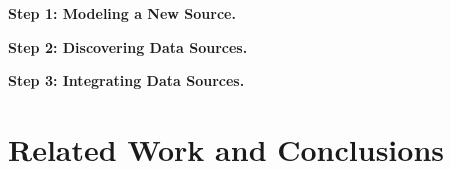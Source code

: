 \documentclass[runningheads,a4paper]{llncs}
\begin{document}
\textbf{Step 1: Modeling a New Source.} 


\textbf{Step 2: Discovering Data Sources.} 


\textbf{Step 3: Integrating Data Sources.} 

\section{Related Work and Conclusions} 



\vspace{-1mm}


\end{document}
